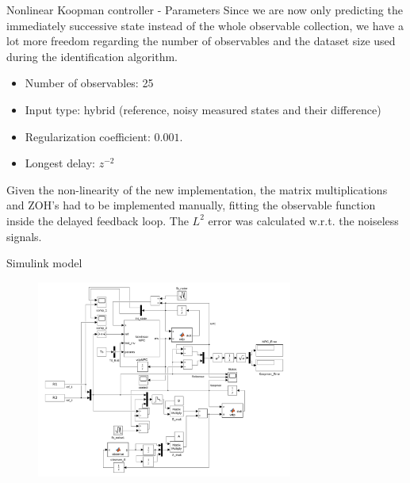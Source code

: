 \documentclass{beamer}
\begin{document}
\begin{frame}{Nonlinear Koopman controller - Parameters}
    Since we are now only predicting the immediately successive state instead of the whole observable collection, we have a lot more freedom regarding the number of observables and the dataset size used during the identification algorithm.

    \begin{itemize}
        \item Number of observables: 25
        \item Input type: hybrid (reference, noisy measured states and their difference)
        \item Regularization coefficient: $0.001$.
        \item Longest delay: $z^{-2}$
    \end{itemize}

    Given the non-linearity of the new implementation, the matrix multiplications and ZOH's had to be implemented manually, fitting the observable function inside the delayed feedback loop. The $L^2$ error was calculated w.r.t. the noiseless signals.
\end{frame}

\begin{frame}{Simulink model}
    \begin{figure}
        \centering
        \includegraphics[width=0.75\textwidth]{Simulink_Koopman.png}
    \end{figure}
\end{frame}
\end{document}
